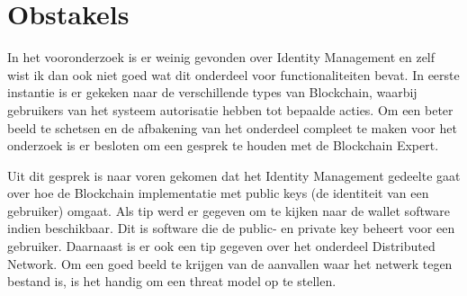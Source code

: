 \section{Obstakels}

In het vooronderzoek is er weinig gevonden over Identity Management en zelf wist ik dan ook niet goed wat dit onderdeel voor functionaliteiten bevat. In eerste instantie is er gekeken naar de verschillende types van Blockchain, waarbij gebruikers van het systeem autorisatie hebben tot bepaalde acties. Om een beter beeld te schetsen en de afbakening van het onderdeel compleet te maken voor het onderzoek is er besloten om een gesprek te houden met de Blockchain Expert.

Uit dit gesprek is naar voren gekomen dat het Identity Management gedeelte gaat over hoe de Blockchain implementatie met public keys (de identiteit van een gebruiker) omgaat. Als tip werd er gegeven om te kijken naar de wallet software indien beschikbaar. Dit is software die de public- en private key beheert voor een gebruiker. Daarnaast is er ook een tip gegeven over het onderdeel Distributed Network. Om een goed beeld te krijgen van de aanvallen waar het netwerk tegen bestand is, is het handig om een threat model op te stellen.